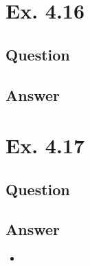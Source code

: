 \documentclass[12pt]{article}
\begin{document}
\newpage
\section*{Ex. 4.16}
\subsection*{Question}

\subsection*{Answer}

\section*{Ex. 4.17}
\subsection*{Question}

\subsection*{Answer}
\begin{itemize}
	\item 
\end{itemize}
\end{document}
